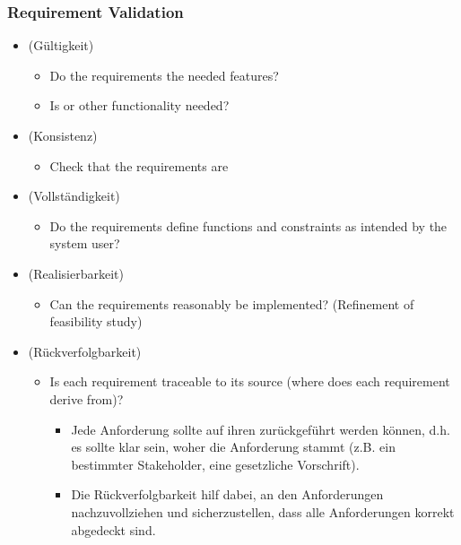 \subsubsection*{Requirement Validation}
\begin{defBox}[title=Requirement Validation Checkpoints]
    \begin{itemize}
        \item {} (Gültigkeit)
        \begin{itemize}
            \item Do the requirements  the needed features?
            \item Is  or other functionality needed?
        \end{itemize}
        \item {} (Konsistenz)
        \begin{itemize}
            \item Check that the requirements are 
        \end{itemize}
        \item {} (Vollständigkeit)
        \begin{itemize}
            \item Do the requirements define  functions and constraints as intended by the system user?
        \end{itemize}
        \item {} (Realisierbarkeit)
        \begin{itemize}
            \item Can the requirements reasonably be implemented? (Refinement of feasibility study)
        \end{itemize}
        \item {} (Rückverfolgbarkeit)
        \begin{itemize}
            \item Is each requirement traceable to its source (where does each requirement derive from)?
            \begin{infoBox}
                \begin{itemize}
                    \item Jede Anforderung sollte auf ihren  zurückgeführt werden können, d.h. es sollte klar sein, woher die Anforderung stammt (z.B. ein bestimmter Stakeholder, eine gesetzliche Vorschrift).
                    \item Die Rückverfolgbarkeit hilf dabei,  an den Anforderungen nachzuvollziehen und sicherzustellen, dass alle Anforderungen korrekt abgedeckt sind.
                \end{itemize}
            \end{infoBox}
        \end{itemize}
    \end{itemize}
\end{defBox}